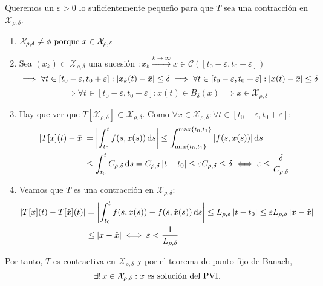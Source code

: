 \begin{teo}
\begin{dem}
		Queremos un $\varepsilon > 0$ lo suficientemente pequeño para que $T$ sea una contracción en $\mathcal{X}_{\rho, \delta}$.
		\begin{enumerate}
			\item $\mathcal{X}_{\rho, \delta} \ne \phi \text{ porque } \bar{x} \in \mathcal{X}_{\rho, \delta}$
			\item Sea $(x_k) \subset \mathcal{X}_{\rho, \delta}$ una sucesión $: x_k \xrightarrow{k\to \infty} x \in \mathcal{C}([t_0-\varepsilon, t_0+\varepsilon])$
			      \[\implies \forall t \in [t_0-\varepsilon, t_0+\varepsilon] : \left|x_k(t) - \bar{x}\right| \leq \delta \implies \forall t \in [t_0-\varepsilon, t_0+\varepsilon] : \left|x(t) - \bar{x}\right| \leq \delta\]
			      \[\implies \forall t \in [t_0-\varepsilon, t_0+\varepsilon] : x(t) \in B_\delta(\bar{x}) \implies x \in \mathcal{X}_{\rho, \delta}\]
			\item Hay que ver que $T[\mathcal{X}_{\rho, \delta}] \subset \mathcal{X}_{\rho, \delta}$. Como $\forall x \in \mathcal{X}_{\rho, \delta} : \forall t \in [t_0-\varepsilon, t_0+\varepsilon] :$
			      \[\begin{aligned}
					      \abs{T[x](t) - \bar{x}} & = \abs{\int_{t_0}^{t} f(s, x(s)) \odif{s}} \leq \int_{\min\{t_0,t_1\}}^{\max\{t_0, t_1\}} \abs{f(s, x(s))} \odif{s}                                                              \\
					                              & \leq \int_{t_0}^{t} C_{\rho, \delta} \odif{s} = C_{\rho, \delta} \abs{t-t_0} \leq \varepsilon C_{\rho, \delta} \leq \delta \iff \varepsilon \leq \frac{\delta}{C_{\rho, \delta}}
				      \end{aligned}\]
			\item Veamos que $T$ es una contracción en $\mathcal{X}_{\rho, \delta}$:
			      \[\begin{aligned}
					      \abs{T[x](t) - T[\hat{x}](t)} & = \abs{\int_{t_0}^{t} f(s, x(s)) - f(s, \hat{x}(s)) \odif{s}} \leq L_{\rho, \delta} \abs{t - t_0} \leq \varepsilon L_{\rho, \delta} \abs{x - \hat{x}} \\
						  & \leq \abs{x - \hat{x}} \iff \varepsilon < \frac{1}{L_{\rho, \delta}}
				      \end{aligned}\]
		\end{enumerate}
		Por tanto, $T$ es contractiva en $\mathcal{X}_{\rho, \delta}$ y por el teorema de punto fijo de Banach, 
		\[\exists! \, x \in \mathcal{X}_{\rho, \delta} : x \text{ es solución del PVI.}\]
	\end{dem}
\end{teo}
